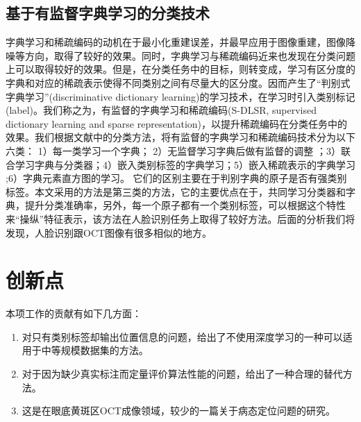     \subsection{基于有监督字典学习的分类技术}
    字典学习和稀疏编码的动机在于最小化重建误差，并最早应用于图像重建，图像降噪等方向，取得了较好的效果。同时，字典学习与稀疏编码近来也发现在分类问题上可以取得较好的效果。但是，在分类任务中的目标，则转变成，学习有区分度的字典和对应的稀疏表示使得不同类别之间有尽量大的区分度。因而产生了“判别式字典学习”(discriminative dictionary learning)的学习技术，在学习时引入类别标记(label)。我们称之为，有监督的字典学习和稀疏编码(S-DLSR, supervised dictionary learning and sparse representation)，以提升稀疏编码在分类任务中的效果。我们根据文献中的分类方法，将有监督的字典学习和稀疏编码技术分为以下六类： 1）每一类学习一个字典\cite{wright2009robust,yang2010metaface}； 2）无监督学习字典后做有监督的调整\cite{fulkerson2008localizing} ；3）联合学习字典与分类器\cite{mairal2008discriminative,jiang2013label,zhang2010discriminative,pham2008joint,yang2008unifying}；4）嵌入类别标签的字典学习\cite{yang2011fisher,rodriguez2008sparse}；5）嵌入稀疏表示的字典学习 \cite{gangeh2013kernelized,zhang2013simultaneous,lazebnik2009supervised};6）字典元素直方图的学习。\cite{lian2010probabilistic,zhang2009learning}
    它们的区别主要在于判别字典的原子是否有强类别标签。本文采用的方法是第三类\cite{jiang2013label}的方法，它的主要优点在于，共同学习分类器和字典，提升分类准确率，另外，每一个原子都有一个类别标签，可以根据这个特性来“操纵”特征表示，该方法在人脸识别任务上取得了较好方法。后面的分析我们将发现，人脸识别跟OCT图像有很多相似的地方。

\section{创新点}
    本项工作的贡献有如下几方面：
    \begin{enumerate}
        \item 对只有类别标签却输出位置信息的问题，给出了不使用深度学习的一种可以适用于中等规模数据集的方法。
        \item 对于因为缺少真实标注而定量评价算法性能的问题，给出了一种合理的替代方法。
        \item 这是在眼底黄斑区OCT成像领域，较少的一篇关于病态定位问题的研究。
    \end{enumerate}
